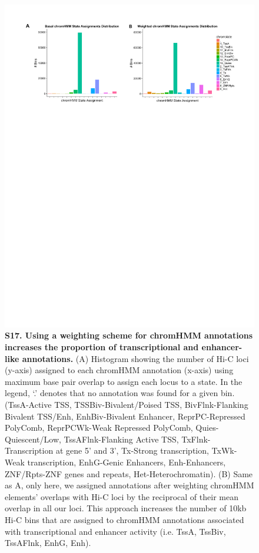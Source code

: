\begin{figure}[!htb]
\centering
\includegraphics[width=6in]{img/figS17.pdf}
\caption[Using a weighting scheme for chromHMM annotations increases the proportion of transcriptional and enhancer-like annotations.]{\textbf{S17. Using a weighting scheme for chromHMM annotations increases the proportion of transcriptional and enhancer-like annotations.} (A) Histogram showing the number of Hi-C loci (y-axis) assigned to each chromHMM annotation (x-axis) using maximum base pair overlap to assign each locus to a state. In the legend, `.' denotes that no annotation was found for a given bin. (TssA-Active TSS, TSSBiv-Bivalent/Poised TSS, BivFlnk-Flanking Bivalent TSS/Enh, EnhBiv-Bivalent Enhancer, ReprPC-Repressed PolyComb, ReprPCWk-Weak Repressed PolyComb, Quies-Quiescent/Low, TssAFlnk-Flanking Active TSS, TxFlnk-Transcription at gene 5' and 3', Tx-Strong transcription, TxWk-Weak transcription, EnhG-Genic Enhancers, Enh-Enhancers, ZNF/Rpts-ZNF genes and repeats, Het-Heterochromatin). (B) Same as A, only here, we assigned annotations after weighting chromHMM elements' overlaps with Hi-C loci by the reciprocal of their mean overlap in all our loci. This approach increases the number of 10kb Hi-C bins that are assigned to chromHMM annotations associated with transcriptional and enhancer activity (i.e. TssA, TssBiv, TssAFlnk, EnhG, Enh).}
\label{fig:ch02-figS17}
\end{figure}

